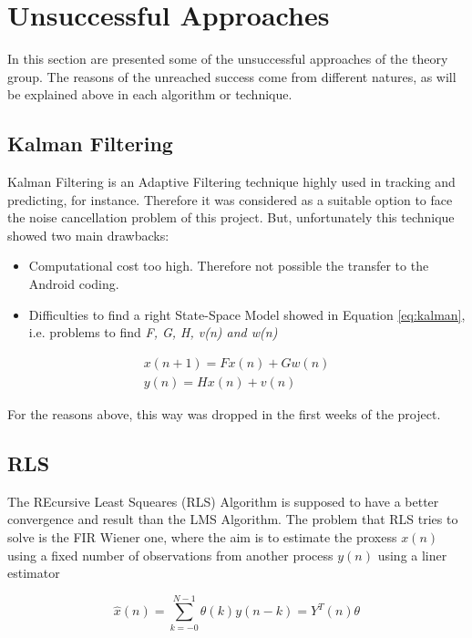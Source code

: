 \documentclass[11pt,a4paper,english]{book}  %
\theoremstyle{definition}  %
\theoremstyle{plain}  %
\theoremstyle{remark}  %
\begin{document}
\section{Unsuccessful Approaches}

In this section are presented some of the unsuccessful approaches of the theory group. The reasons of the unreached success come from different natures, as will be explained above in each algorithm or technique.

	\subsection{Kalman Filtering}
	Kalman Filtering is an Adaptive Filtering technique highly used in tracking and predicting, for instance. Therefore it was considered as a suitable option to face the noise cancellation problem of this project. But, unfortunately this technique showed two main drawbacks:
	
	\begin{itemize}
	\item Computational cost too high. Therefore not possible the transfer to the Android coding.
	\item Difficulties to find a right State-Space Model showed in Equation \ref{eq:kalman}, i.e. problems to find \textit{F, G, H, v(n) and w(n)}
	\end{itemize}
	
	
	\begin{subequations}
	\label{eq:kalman}
	\begin{align}
	x(n+1)=Fx(n)+Gw(n)\\
	y(n)=Hx(n)+v(n)	
	\end{align}
	
	\end{subequations}
	
	For the reasons above, this way was dropped in the first weeks of the project.
	
	\subsection{RLS}
	
	The REcursive Least Squeares (RLS) Algorithm \cite{asp} is supposed to have a better convergence and result than the LMS Algorithm. The problem that RLS tries to solve is the FIR Wiener one, where the aim is to estimate the proxess $x(n)$ using a fixed number of observations from another process ${y(n)}$ using a liner estimator
	
	\begin{equation}
	\hat{x}(n)=\sum \limits_{k=-0}^{N-1} \theta(k)y(n-k)=Y^T (n)\theta
	\end{equation}
	
\end{document}
